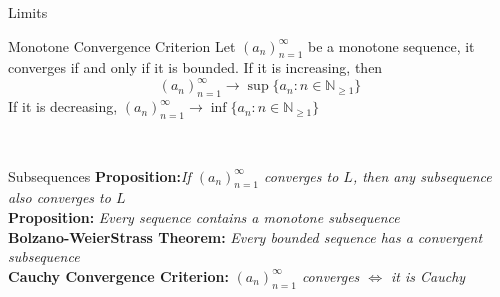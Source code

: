 \documentclass{article}
\begin{document}
\begin{multicols*}{3}
\begin{blackbox}{Limits}
    \begin{bluebox}{Monotone Convergence Criterion}
        Let $(a_n)_{n=1}^\infty$ be a monotone sequence, it converges if and only if it is bounded. If it is increasing, then\\[-1ex]
        \[(a_n)_{n=1}^\infty \rightarrow \sup \{a_n: n \in \mathbb{N}_{\geq 1}\}\]
        If it is decreasing,
         $(a_n)_{n=1}^\infty \rightarrow \inf \{a_n: n \in \mathbb{N}_{\geq 1}\}$
    \end{bluebox}\\[-1ex]
\end{blackbox}
\begin{blackbox}{Subsequences}
    \textbf{Proposition:}\textit{If $(a_n)_{n=1}^\infty$ converges to $L$, then any subsequence also converges to $L$}\\[1ex]
        \textbf{Proposition:} \textit{Every sequence contains a monotone subsequence}\\[1ex]
        \textbf{Bolzano-WeierStrass Theorem:} \textit{Every bounded sequence has a convergent subsequence}\\[1ex]
        \textbf{Cauchy Convergence Criterion:} \textit{$(a_n)_{n=1}^\infty$ converges $\iff$ it is Cauchy}\\
\end{blackbox}


\end{multicols*}
\end{document}
